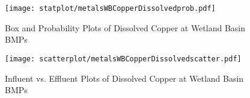         \begin{figure}[hb]   %
            \centering
            \texttt{[image: statplot/metalsWBCopperDissolvedprob.pdf]}
            \caption{Box and Probability Plots of Dissolved Copper at Wetland Basin BMPs}
        \end{figure}         %
        
        
        \begin{figure}[hb]   %
            \centering
            \texttt{[image: scatterplot/metalsWBCopperDissolvedscatter.pdf]}
            \caption{Influent vs. Effluent Plots of Dissolved Copper at Wetland Basin BMPs}
        \end{figure}         %
        \clearpage
        